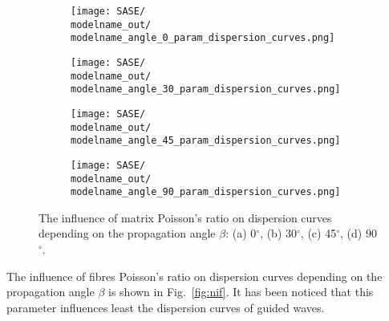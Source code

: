 \documentclass[preprint,12pt]{elsarticle}
\begin{document}
\begin{figure} [h!]
	\centering
	\newcommand{\modelname}{SASE6}
	\begin{subfigure}[b]{0.49\textwidth}
		\centering
		\texttt{[image: SASE/\\modelname\_out/\\modelname\_angle\_0\_param\_dispersion\_curves.png]}
		\caption{}
		\label{fig:nim0}
	\end{subfigure}
	\hfill
	\begin{subfigure}[b]{0.49\textwidth}
		\centering
		\texttt{[image: SASE/\\modelname\_out/\\modelname\_angle\_30\_param\_dispersion\_curves.png]}
		\caption{}
		\label{fig:nim30}
	\end{subfigure}
	\begin{subfigure}[b]{0.49\textwidth}
		\centering
		\texttt{[image: SASE/\\modelname\_out/\\modelname\_angle\_45\_param\_dispersion\_curves.png]}
		\caption{}
		\label{fig:nim45}
	\end{subfigure}
	\hfill
	\begin{subfigure}[b]{0.49\textwidth}
		\centering
		\texttt{[image: SASE/\\modelname\_out/\\modelname\_angle\_90\_param\_dispersion\_curves.png]}
		\caption{}
		\label{fig:nim90}
	\end{subfigure}
	\caption{The influence of matrix Poisson's ratio on dispersion curves depending on the propagation angle $\beta$: (a) 0$^{\circ}$, (b) 30$^{\circ}$, (c) 45$^{\circ}$, (d) 90$^{\circ}$.} 
	\label{fig:nim}
\end{figure}
\clearpage

The influence of fibres Poisson's ratio on dispersion curves depending on the propagation angle $\beta$ is shown in Fig.~\ref{fig:nif}. It has been noticed that this parameter influences least the dispersion curves of guided waves.
\end{document}
